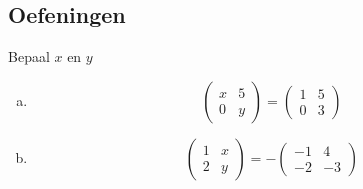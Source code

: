 \documentclass[12pt,twoside]{article}
\begin{document}
\needspace{3cm}
\subsection{Oefeningen}

\begin{oefening}
Bepaal $x$ en $y$
\begin{enumerate}[(a)]
  \item
    $$\begin{pmatrix}
      x & 5\\
      0 & y
    \end{pmatrix}
    =
    \begin{pmatrix}
      1 & 5\\
      0 & 3
    \end{pmatrix}$$
  \item
    $$\begin{pmatrix}
      1 & x\\
      2 & y
    \end{pmatrix}
    =
    -\begin{pmatrix}
      -1 & 4\\
      -2 & -3
    \end{pmatrix}$$
\end{enumerate}
\end{oefening}
\end{document}
